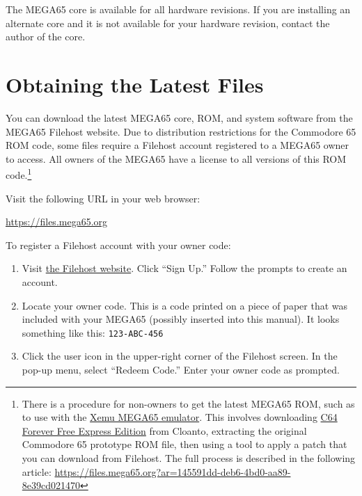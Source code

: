 The MEGA65 core is available for all hardware revisions. If you are installing an alternate core and it is not available for your hardware revision, contact the author of the core.

\section{Obtaining the Latest Files}

You can download the latest MEGA65 core, ROM, and system software from the MEGA65 Filehost website. Due to distribution restrictions for the Commodore 65 ROM code, some files require a Filehost account registered to a MEGA65 owner to access. All owners of the MEGA65 have a license to all versions of this ROM code.\footnote{There is a procedure for non-owners to get the latest MEGA65 ROM, such as to use with the \href{https://github.lgb.hu/xemu/}{Xemu MEGA65 emulator}. This involves downloading \href{https://www.c64forever.com/}{C64 Forever Free Express Edition} from Cloanto, extracting the original Commodore 65 prototype ROM file, then using a tool to apply a patch that you can download from Filehost. The full process is described in the following article: \url{https://files.mega65.org?ar=145591dd-deb6-4bd0-aa89-8e39cd021470}}

Visit the following URL in your web browser:

\url{https://files.mega65.org}

\begin{center}
\end{center}

To register a Filehost account with your owner code:

\begin{enumerate}
  \item Visit \href{https://files.mega65.org}{the Filehost website}. Click ``Sign Up.'' Follow the prompts to create an account.
  \item Locate your owner code. This is a code printed on a piece of paper that was included with your MEGA65 (possibly inserted into this manual). It looks something like this: {\tt 123-ABC-456}
  \item Click the user icon in the upper-right corner of the Filehost screen. In the pop-up menu, select ``Redeem Code.'' Enter your owner code as prompted.
\end{enumerate}

